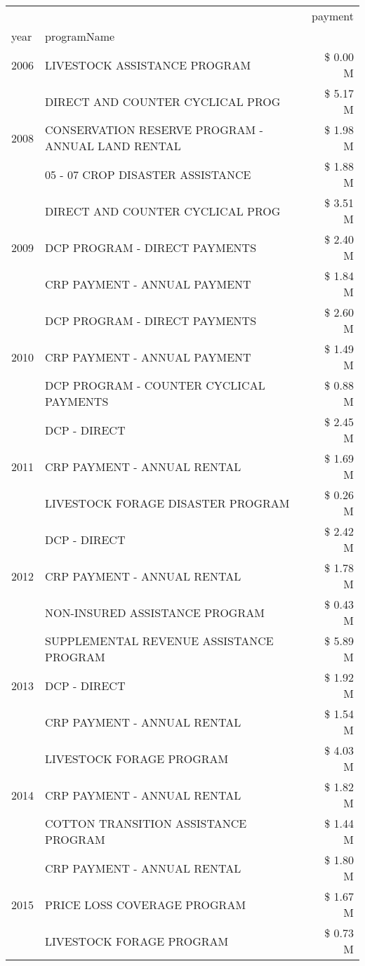 \begin{tabular}{llr}
\toprule
 &  & payment \\
year & programName &  \\
\midrule
2006 & LIVESTOCK ASSISTANCE PROGRAM & \$ 0.00 M \\
\cline{1-3}
\multirow[t]{3}{*}{2008} & DIRECT AND COUNTER CYCLICAL PROG & \$ 5.17 M \\
 & CONSERVATION RESERVE PROGRAM - ANNUAL LAND RENTAL & \$ 1.98 M \\
 & 05 - 07 CROP DISASTER ASSISTANCE & \$ 1.88 M \\
\cline{1-3}
\multirow[t]{3}{*}{2009} & DIRECT AND COUNTER CYCLICAL PROG & \$ 3.51 M \\
 & DCP PROGRAM - DIRECT PAYMENTS & \$ 2.40 M \\
 & CRP PAYMENT - ANNUAL PAYMENT & \$ 1.84 M \\
\cline{1-3}
\multirow[t]{3}{*}{2010} & DCP PROGRAM - DIRECT PAYMENTS & \$ 2.60 M \\
 & CRP PAYMENT - ANNUAL PAYMENT & \$ 1.49 M \\
 & DCP PROGRAM - COUNTER CYCLICAL PAYMENTS & \$ 0.88 M \\
\cline{1-3}
\multirow[t]{3}{*}{2011} & DCP - DIRECT & \$ 2.45 M \\
 & CRP PAYMENT - ANNUAL RENTAL & \$ 1.69 M \\
 & LIVESTOCK FORAGE DISASTER PROGRAM & \$ 0.26 M \\
\cline{1-3}
\multirow[t]{3}{*}{2012} & DCP - DIRECT & \$ 2.42 M \\
 & CRP PAYMENT - ANNUAL RENTAL & \$ 1.78 M \\
 & NON-INSURED ASSISTANCE PROGRAM & \$ 0.43 M \\
\cline{1-3}
\multirow[t]{3}{*}{2013} & SUPPLEMENTAL REVENUE ASSISTANCE PROGRAM & \$ 5.89 M \\
 & DCP - DIRECT & \$ 1.92 M \\
 & CRP PAYMENT - ANNUAL RENTAL & \$ 1.54 M \\
\cline{1-3}
\multirow[t]{3}{*}{2014} & LIVESTOCK FORAGE PROGRAM & \$ 4.03 M \\
 & CRP PAYMENT - ANNUAL RENTAL & \$ 1.82 M \\
 & COTTON TRANSITION ASSISTANCE PROGRAM & \$ 1.44 M \\
\cline{1-3}
\multirow[t]{3}{*}{2015} & CRP PAYMENT - ANNUAL RENTAL & \$ 1.80 M \\
 & PRICE LOSS COVERAGE PROGRAM & \$ 1.67 M \\
 & LIVESTOCK FORAGE PROGRAM & \$ 0.73 M \\

\end{tabular}
